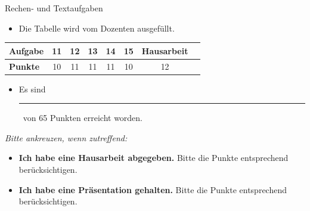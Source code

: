 \documentclass[a4paper, 9pt]{scrartcl}\usepackage[]{graphicx}\usepackage[]{xcolor}
\begin{document}
\begin{graybox}{Rechen- und Textaufgaben}
  \begin{itemize}
  \item Die Tabelle wird vom Dozenten ausgefüllt.
  \end{itemize}
  \begin{center}
    \large
    \begin{tabular}{|l|c|c|c|c|c|c|c|}
      \hline
      \textbf{Aufgabe} & \textbf{11} & \textbf{12} & \textbf{13} & \textbf{14} & \textbf{15} &  \textbf{Hausarbeit} \strut\\
      \hline
      \textbf{Punkte} & 
      \hspace{1Ex}\Large\textcolor{gray!70}{10}\hspace{1Ex}  & 
      \hspace{1Ex}\Large\textcolor{gray!70}{11}\hspace{1Ex}  & 
      \hspace{1Ex}\Large\textcolor{gray!70}{11}\hspace{1Ex}  & 
      \hspace{1Ex}\Large\textcolor{gray!70}{11}\hspace{1Ex}  & 
      \hspace{1Ex}\Large\textcolor{gray!70}{10}\hspace{1Ex}  & 
      \hspace{1Ex}\Large\textcolor{gray!70}{12}\hspace{1Ex}  \strut\\
      \hline
  \end{tabular}
\end{center}
\begin{itemize}
\item Es sind \rule[0ex]{2em}{.4pt}\, von 65 Punkten erreicht worden.
\end{itemize}
\vspace{2Ex}
\textit{Bitte ankreuzen, wenn zutreffend:}
\begin{itemize}
\item [\msquare] \textbf{Ich habe eine Hausarbeit abgegeben.} Bitte die Punkte entsprechend berücksichtigen.
\item [\msquare] \textbf{Ich habe eine Präsentation gehalten.} Bitte die Punkte entsprechend berücksichtigen.
\end{itemize}
\end{graybox}

\clearpage
\end{document}
